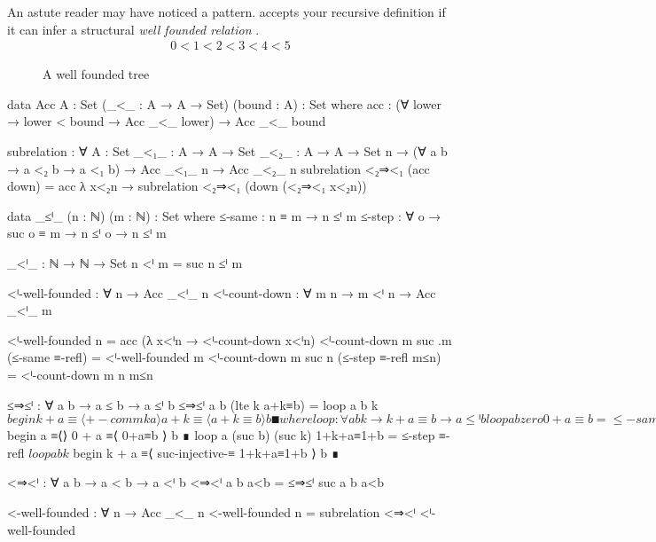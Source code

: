 \documentclass[./Thesis.tex]{subfiles}
\begin{document}
An astute reader may have noticed a pattern. \Agda{} accepts your recursive
definition if it can infer a structural \textit{well founded relation}
\cite{soare}.
\begin{align}
  \label{eqn:wellfounded-linear}
  0 < 1 < 2 < 3 < 4 < 5
\end{align}

\begin{figure}[h]
  \centering
  \caption{A well founded tree }
  \label{fig:wellfounded-tree}
\end{figure}

\begin{code}
  data Acc {A : Set} (_<_ : A → A → Set) (bound : A) : Set where
    acc : (∀ {lower} → lower < bound → Acc _<_ lower)
        → Acc _<_ bound

  subrelation
      : ∀ {A : Set} {_<₁_ : A → A → Set} {_<₂_ : A → A → Set} {n}
      → (∀ {a b} → a <₂ b → a <₁ b)
      → Acc _<₁_ n
      → Acc _<₂_ n
  subrelation <₂⇒<₁ (acc down) =
    acc λ x<₂n → subrelation <₂⇒<₁ (down (<₂⇒<₁ x<₂n))

  data _≤ⁱ_ (n : ℕ) (m : ℕ) : Set where
    ≤-same : n ≡ m → n ≤ⁱ m
    ≤-step : ∀ {o} → suc o ≡ m → n ≤ⁱ o → n ≤ⁱ m

  _<ⁱ_ : ℕ → ℕ → Set
  n <ⁱ m = suc n ≤ⁱ m

  <ⁱ-well-founded : ∀ {n} → Acc _<ⁱ_ n
  <ⁱ-count-down : ∀ {m n} → m <ⁱ n → Acc _<ⁱ_ m

  <ⁱ-well-founded {n} = acc (λ x<ⁱn → <ⁱ-count-down x<ⁱn)
  <ⁱ-count-down {m} {suc .m} (≤-same ≡-refl) = <ⁱ-well-founded {m}
  <ⁱ-count-down {m} {suc n} (≤-step ≡-refl m≤n) = <ⁱ-count-down {m} {n} m≤n

  ≤⇒≤ⁱ : ∀ {a b} → a ≤ b → a ≤ⁱ b
  ≤⇒≤ⁱ {a} {b} (lte k a+k≡b) = loop a b k $ begin
    k + a ≡⟨ +-comm k a ⟩ a + k ≡⟨ a+k≡b ⟩ b ∎
    where
    loop : ∀ a b k → k + a ≡ b → a ≤ⁱ b
    loop a b zero 0+a≡b = ≤-same $ begin
      a ≡⟨⟩ 0 + a ≡⟨ 0+a≡b ⟩ b ∎
    loop a (suc b) (suc k) 1+k+a≡1+b = ≤-step ≡-refl $ loop a b k $ begin
      k + a ≡⟨ suc-injective-≡ 1+k+a≡1+b ⟩ b ∎

  <⇒<ⁱ : ∀ {a b} → a < b → a <ⁱ b
  <⇒<ⁱ {a} {b} a<b = ≤⇒≤ⁱ {suc a} {b} a<b

  <-well-founded : ∀ {n} → Acc _<_ n
  <-well-founded {n} = subrelation <⇒<ⁱ <ⁱ-well-founded
\end{code}
\end{document}
